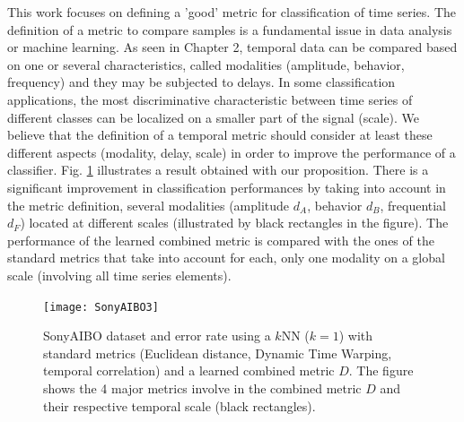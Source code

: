 This work focuses on defining a 'good' metric for classification of time series. The definition of a metric to compare samples is a fundamental issue in data analysis or machine learning. As seen in Chapter 2, temporal data can be compared based on one or several characteristics, called modalities (amplitude, behavior, frequency) and they may be subjected to delays. In some classification applications, the most discriminative characteristic between time series of different classes can be localized on a smaller part of the signal (scale). We believe that the definition of a temporal metric should consider at least these different aspects (modality, delay, scale) in order to improve the performance of a classifier. Fig. \ref{fig:SonyAIBO} illustrates a result obtained with our proposition. There is a significant improvement in classification performances by taking into account in the metric definition, several modalities (amplitude $d_A$, behavior $d_B$, frequential $d_F$) located at different scales (illustrated by black rectangles in the figure). The performance of the learned combined metric is compared with the ones of the standard metrics that take into account for each, only one modality on a global scale (involving all time series elements).  




\begin{figure}[h!]
	\centering
	\texttt{[image: SonyAIBO3]}
	\caption{SonyAIBO dataset and error rate using a $k$NN ($k=1$) with standard metrics (Euclidean distance, Dynamic Time Warping, temporal correlation) and a learned combined metric $D$. The figure shows the 4 major metrics involve in the combined metric $D$ and their respective temporal scale (black rectangles).}
	\label{fig:SonyAIBO}
\end{figure}


